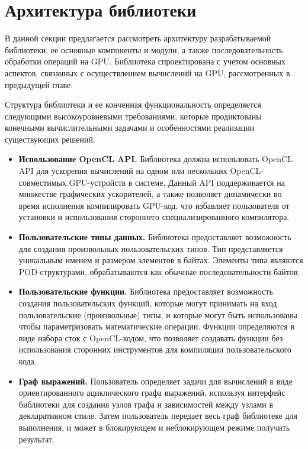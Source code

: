 \section{Архитектура библиотеки}

В данной секции предлагается рассмотреть архитектуру разрабатываемой библиотеки, ее основные компоненты и модули, а также последовательность обработки операций на GPU. Библиотека спроектирована с учетом основных аспектов, связанных с осуществлением вычислений на GPU, рассмотренных в предыдущей главе.

Структура библиотеки и ее конченная функциональность определяется следующими высокоуровневыми требованиями, которые продиктованы конечными вычислительными задачами и особенностями реализации существующих решений.

\begin{itemize}%
    \item \textbf{Использование OpenCL API.} Библиотека должна использовать OpenCL API для ускорения вычислений на одном или нескольких OpenCL-совместимых GPU-устройств в системе. Данный API поддерживается на множестве графических ускорителей, а также позволяет динамически во время исполнения компилировать GPU-код, что избавляет пользователя от установки и использования стороннего специализированного компилятора.
    
    \item \textbf{Пользовательские типы данных.} Библиотека предоставляет возможность для создания произвольных пользовательских типов. Тип представляется уникальным именем и размером элементов в байтах. Элементы типа являются POD-структурами, обрабатываются как обычные последовательности байтов. 
    
    \item \textbf{Пользовательские функции.} Библиотека предоставляет возможность создания пользовательских функций, которые могут принимать на вход пользовательские (произвольные) типы, и которые могут быть использованы чтобы параметризовать математические операции. Функции определяются в виде набора сток с OpenCL-кодом, что позволяет создавать функции без использования сторонних инструментов для компиляции пользовательского кода. 
    
    \item \textbf{Граф выражений.} Пользователь определяет задачи для вычислений в виде ориентированного ациклического графа выражений, используя интерфейс библиотеки для создания узлов графа и зависимостей между узлами в декларативном стиле. Затем пользователь передает весь граф библиотеке для выполнения, и может в блокирующем и неблокирующем режиме получить результат.
    

\end{itemize}
